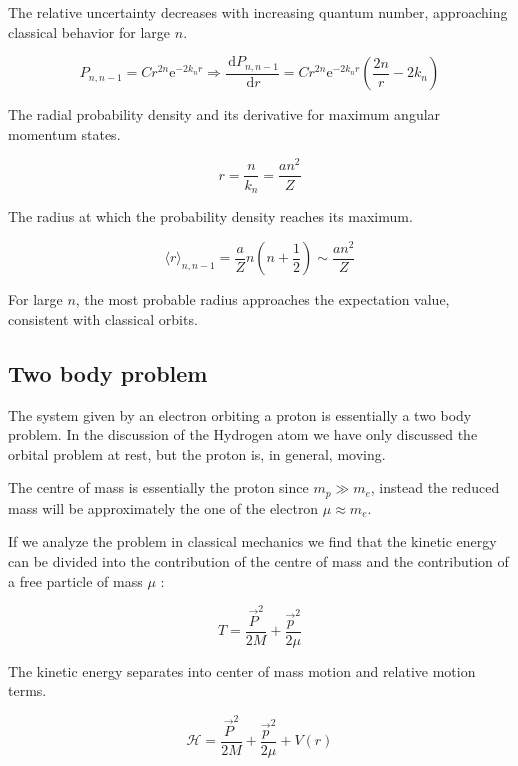 \documentclass[italian]{HKNdocument}
\begin{document}
The relative uncertainty decreases with increasing quantum number, approaching classical behavior for large $n$.

\begin{equation}
P_{n, n-1}=C r^{2 n} \mathrm{e}^{-2 k_{n} r} \Longrightarrow \frac{\, \mathrm{d} P_{n, n-1}}{\, \mathrm{d} r}=C r^{2 n} \mathrm{e}^{-2 k_{n} r}\left(\frac{2 n}{r}-2 k_{n}\right) \label{eq:9.105}
\end{equation}

The radial probability density and its derivative for maximum angular momentum states.

\begin{equation}
r=\frac{n}{k_{n}}=\frac{a n^{2}}{Z} \label{eq:9.106}
\end{equation}

The radius at which the probability density reaches its maximum.

\begin{equation}
\langle r\rangle_{n, n-1}=\frac{a}{Z} n\left(n+\frac{1}{2}\right) \sim \frac{a n^{2}}{Z} \label{eq:9.107}
\end{equation}

For large $n$, the most probable radius approaches the expectation value, consistent with classical orbits.

\subsection{Two body problem}
The system given by an electron orbiting a proton is essentially a two body problem. In the discussion of the Hydrogen atom we have only discussed the orbital problem at rest, but the proton is, in general, moving.

The centre of mass is essentially the proton since $m_{p} \gg m_{e}$, instead the reduced mass will be approximately the one of the electron $\mu \approx m_{e}$.

If we analyze the problem in classical mechanics we find that the kinetic energy can be divided into the contribution of the centre of mass and the contribution of a free particle of mass $\mu$ :

\begin{equation}
T=\frac{\vec{P}^{2}}{2 M}+\frac{\vec{p}^{2}}{2 \mu} \label{eq:9.108}
\end{equation}

The kinetic energy separates into center of mass motion and relative motion terms.

\begin{equation}
\mathcal{H}=\frac{\vec{P}^{2}}{2 M}+\frac{\vec{p}^{2}}{2 \mu}+V(r) \label{eq:9.109}
\end{equation}
\end{document}
